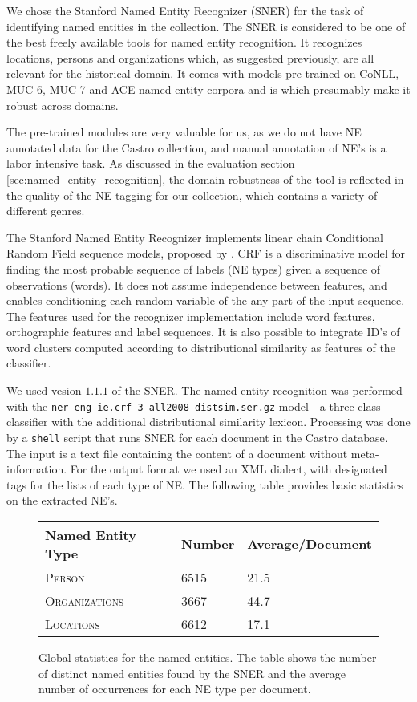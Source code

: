
We chose the Stanford Named Entity Recognizer (SNER) \cite{sner} for the task of identifying named entities in the collection.
The SNER is considered to be one of the best freely available tools for named entity recognition.
It recognizes locations, persons and organizations which, as suggested previously, are all relevant for the historical domain. 
It comes with models pre-trained on CoNLL, MUC-6, MUC-7 and ACE named entity corpora and is which presumably make it robust across domains.

The pre-trained modules are very valuable for us, as we do not have NE annotated data for the Castro collection, and manual annotation of NE's is a labor intensive task. As discussed in the evaluation section \ref{sec:named_entity_recognition}, the domain robustness of the tool is reflected in the quality of the NE tagging for our collection, which contains a variety of different genres. 

The Stanford Named Entity Recognizer implements linear chain Conditional Random Field sequence models, proposed by \cite{lafferty2001conditional}.
CRF is a discriminative model for finding the most probable sequence of labels (NE types) given a sequence of observations (words). 
It does not assume independence between features, and enables conditioning each random variable of the any part of the input sequence. The features used for the recognizer implementation include word features, orthographic features and label sequences. It is also possible to integrate ID's of word clusters computed according to distributional similarity as features of the classifier.

We used vesion $1.1.1$ of the SNER. The named entity recognition was performed with the
\texttt{ner-eng-ie.crf-3-all2008-distsim.ser.gz} model - a three class classifier with the additional
distributional similarity lexicon. Processing was done by a
\texttt{shell} script that runs SNER for each document in the Castro database. The input is a
text file containing the content of a document without meta-information. For the output format we
used an XML dialect, with designated tags for the lists of each type of NE. The following table provides basic statistics on the extracted NE's.

\begin{figure}[ht]
\centering
\caption{Global statistics for the named entities. The table shows the number of distinct named
entities found by the SNER and the average number of occurrences for each NE type per document.}
\begin{tabular}{l|ll}
  Named Entity Type      & Number & Average/Document\\
  \hline
  \textsc{Person}        & 6515   & 21.5\\
  \textsc{Organizations} & 3667   & 44.7\\
  \textsc{Locations}     & 6612   & 17.1\\
\end{tabular}
\label{fig:ne_statistics}
\end{figure}


